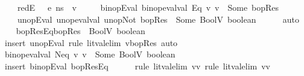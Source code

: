 \begin{isabellebody}
\ \ \ \ redE{}{\isacharcolon}{\kern0pt}\ {\isachardoublequoteopen}{\isasymLambda}{\isacharcomma}{\kern0pt}{\isasymGamma}{\isacharcomma}{\kern0pt}{\isasymOmega}\ {\isasymturnstile}\ {\isasymlangle}e{}{\isacharcomma}{\kern0pt}\ ns{\isasymrangle}\ {\isasymDown}\ v{}{\isachardoublequoteclose}\ \isanewline
\ \ \ \ binopEval{\isacharcolon}{\kern0pt}\ {\isachardoublequoteopen}binop{\isacharunderscore}{\kern0pt}eval{\isacharunderscore}{\kern0pt}val\ Eq\ v{}\ v{}\ {\isacharequal}{\kern0pt}\ Some\ bopRes{\isachardoublequoteclose}\ \isanewline
\ \ \ \ unopEval{\isacharcolon}{\kern0pt}\ {\isachardoublequoteopen}unop{\isacharunderscore}{\kern0pt}eval{\isacharunderscore}{\kern0pt}val\ unop{\isachardot}{\kern0pt}Not\ bopRes\ {\isacharequal}{\kern0pt}\ Some\ {\isacharparenleft}{\kern0pt}BoolV\ boolean{\isacharparenright}{\kern0pt}{\isachardoublequoteclose}\isanewline
\ \ \ \ \isamarkupfalse%
\ auto\isanewline
\isanewline
\ \ \isamarkupfalse%
\ bopResEq{\isacharcolon}{\kern0pt}{\isachardoublequoteopen}bopRes\ {\isacharequal}{\kern0pt}\ BoolV\ {\isacharparenleft}{\kern0pt}{\isasymnot}boolean{\isacharparenright}{\kern0pt}{\isachardoublequoteclose}\ \isanewline
\ \ \ \ \isamarkupfalse%
\ {\isacharparenleft}{\kern0pt}insert\ unopEval{\isacharcomma}{\kern0pt}\ rule\ lit{\isacharunderscore}{\kern0pt}val{\isacharunderscore}{\kern0pt}elim{\isacharbrackleft}{\kern0pt}\ v{\isacharequal}{\kern0pt}bopRes{\isacharbrackright}{\kern0pt}{\isacharparenright}{\kern0pt}\ auto\isanewline
\isanewline
\ \ \isamarkupfalse%
\ {\isachardoublequoteopen}binop{\isacharunderscore}{\kern0pt}eval{\isacharunderscore}{\kern0pt}val\ Neq\ v{}\ v{}\ {\isacharequal}{\kern0pt}\ Some\ {\isacharparenleft}{\kern0pt}BoolV\ boolean{\isacharparenright}{\kern0pt}{\isachardoublequoteclose}\isanewline
\ \ \ \ \isamarkupfalse%
\ {\isacharparenleft}{\kern0pt}insert\ binopEval\ bopResEq{\isacharparenright}{\kern0pt}\isanewline
\ \ \ \ \isamarkupfalse%
\ {\isacharparenleft}{\kern0pt}rule\ lit{\isacharunderscore}{\kern0pt}val{\isacharunderscore}{\kern0pt}elim{\isacharbrackleft}{\kern0pt}\ v{\isacharequal}{\kern0pt}v{}{\isacharbrackright}{\kern0pt}{\isacharsemicolon}{\kern0pt}\ rule\ lit{\isacharunderscore}{\kern0pt}val{\isacharunderscore}{\kern0pt}elim{\isacharbrackleft}{\kern0pt}\ v{\isacharequal}{\kern0pt}v{}{\isacharbrackright}{\kern0pt}{\isacharparenright}{\kern0pt}\isanewline

\end{isabellebody}
